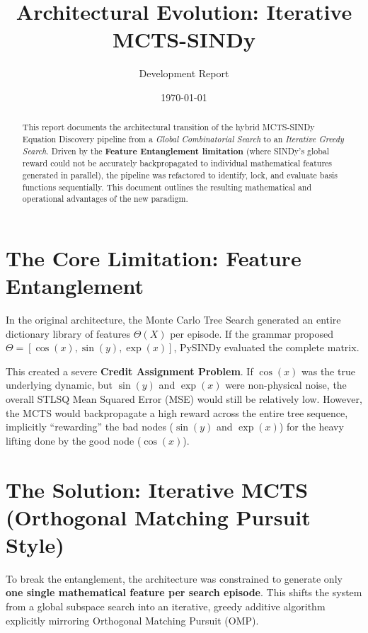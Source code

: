 \documentclass[11pt, a4paper]{article}
\title{\textbf{Architectural Evolution: Iterative MCTS-SINDy}}
\author{Development Report}
\date{\today}
\begin{document}
\maketitle

\begin{abstract}
This report documents the architectural transition of the hybrid MCTS-SINDy Equation Discovery pipeline from a \textit{Global Combinatorial Search} to an \textit{Iterative Greedy Search}. Driven by the \textbf{Feature Entanglement limitation} (where SINDy's global reward could not be accurately backpropagated to individual mathematical features generated in parallel), the pipeline was refactored to identify, lock, and evaluate basis functions sequentially. This document outlines the resulting mathematical and operational advantages of the new paradigm.
\end{abstract}

\section{The Core Limitation: Feature Entanglement}
In the original architecture, the Monte Carlo Tree Search generated an entire dictionary library of features $\Theta(X)$ per episode. If the grammar proposed $\Theta = [\cos(x), \sin(y), \exp(x)]$, PySINDy evaluated the complete matrix. 

This created a severe \textbf{Credit Assignment Problem}. If $\cos(x)$ was the true underlying dynamic, but $\sin(y)$ and $\exp(x)$ were non-physical noise, the overall STLSQ Mean Squared Error (MSE) would still be relatively low. However, the MCTS would backpropagate a high reward across the entire tree sequence, implicitly ``rewarding'' the bad nodes ($\sin(y)$ and $\exp(x)$) for the heavy lifting done by the good node ($\cos(x)$). 

\section{The Solution: Iterative MCTS (Orthogonal Matching Pursuit Style)}
To break the entanglement, the architecture was constrained to generate only \textbf{one single mathematical feature per search episode}. This shifts the system from a global subspace search into an iterative, greedy additive algorithm explicitly mirroring Orthogonal Matching Pursuit (OMP).
\end{document}
